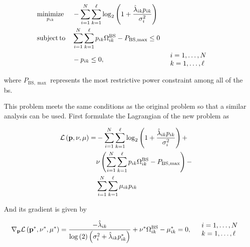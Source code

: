 \begin{equation} \label{eq:optim_modif_wf}
\begin{aligned}
	&\operatorname*{minimize}\limits_{p_{ik}} &&-\sum\limits_{i = 1}^N
	\sum\limits_{k = 1}^\ell \log_2\left( 1 +
	\frac{\hat{\lambda}_{ik} p_{ik}}{\sigma_i^2} \right)\\
	&\operatorname*{subject\,to} &&\sum\limits_{i = 1}^N \sum\limits_{k = 1}^\ell p_{ik} \Omega_{ik}^{\text{BS}} -
    P_{\text{BS},\max} \leq 0\\
    & &&-p_{ik} \leq 0, &&
	\begin{array}{l}
        i = 1, \ldots, N\\
        k = 1, \ldots, \ell
	\end{array}
\end{aligned}
\end{equation}

\noindent
where $P_{\text{BS}, \max}$ represents the most restrictive power constraint
among all of the \gls{bs}.

This problem meets the same conditions as the original problem so that a similar
analysis can be used. First formulate the Lagrangian of the new problem as

\begin{equation} \label{eq:modif_wf_lagrangian}
\begin{aligned}
    \mathcal{L}\left(\mathbf{p}, \nu, \mathbf{\mu}\right) =
    & -\sum\limits_{i = 1}^N
        \sum\limits_{k = 1}^\ell \log_2\left( 1 +
        \frac{\hat{\lambda}_{ik} p_{ik}}{\sigma_i^2} \right) + \\
    & \nu\left(
        \sum\limits_{i = 1}^N \sum\limits_{k = 1}^\ell p_{ik} \Omega_{ik}^{\text{BS}} -
        P_{\text{BS},\max}\right) - \\
    & \sum\limits_{i = 1}^N \sum\limits_{k = 1}^\ell \mu_{ik} p_{ik}
\end{aligned}
\end{equation}

And its gradient is given by

\begin{equation} \label{eq:modif_wf_gradient}
    \mathbf{\nabla}_{\mathbf{p}} \mathcal{L}\left(\mathbf{p}^\ast, \nu^\ast, \mathbf{\mu}^{\ast}
    \right) = 
    \frac{-\hat{\lambda}_{ik}}{\log\left(2\right)\left(\sigma_i^2 +
    \hat{\lambda}_{ik} p_{ik}^\ast\right)} +
    \nu^\ast \Omega_{ik}^{\text{BS}} - \mu_{ik}^\ast = 0,\quad
	\begin{array}{l}
        i = 1, \ldots, N\\
        k = 1, \ldots, \ell
	\end{array}\\
\end{equation}

